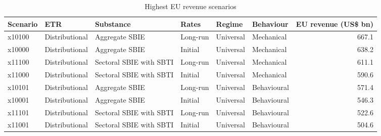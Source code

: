 \begin{table}[H]
\centering
\footnotesize
\setlength{\tabcolsep}{3pt}
\caption{Highest EU revenue scenarios}
\label{tab:app_stage46_top_scenarios}
\begin{tabular}{@{}llllllr@{}}
\toprule
Scenario & ETR & Substance & Rates & Regime & Behaviour & EU revenue (US\$ bn) \\
\midrule
x10100 & Distributional & Aggregate SBIE & Long-run & Universal & Mechanical & 667.1 \\
x10000 & Distributional & Aggregate SBIE & Initial & Universal & Mechanical & 638.2 \\
x11100 & Distributional & Sectoral SBIE with SBTI & Long-run & Universal & Mechanical & 611.1 \\
x11000 & Distributional & Sectoral SBIE with SBTI & Initial & Universal & Mechanical & 590.6 \\
x10101 & Distributional & Aggregate SBIE & Long-run & Universal & Behavioural & 571.4 \\
x10001 & Distributional & Aggregate SBIE & Initial & Universal & Behavioural & 546.3 \\
x11101 & Distributional & Sectoral SBIE with SBTI & Long-run & Universal & Behavioural & 522.6 \\
x11001 & Distributional & Sectoral SBIE with SBTI & Initial & Universal & Behavioural & 504.6 \\
\bottomrule
\end{tabular}
\end{table}
